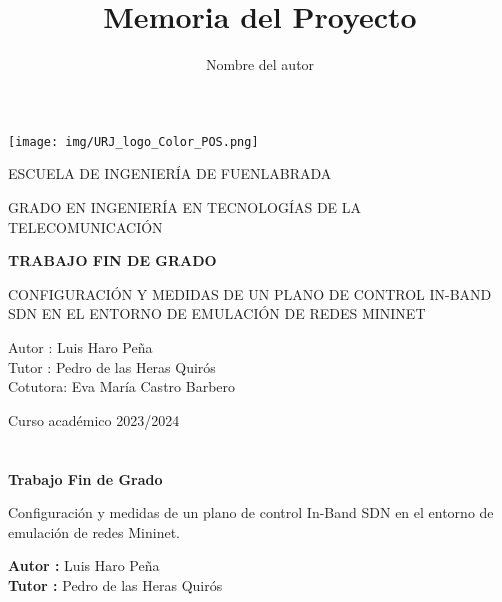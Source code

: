 \documentclass[a4paper, 12pt]{book}
\title{Memoria del Proyecto}
\author{Nombre del autor}
\begin{document}
	
	\renewcommand{\refname}{Bibliografía}  %
	\renewcommand{\appendixname}{Apéndice}
	
	
	
	\begin{titlepage}
		\begin{center}
			\texttt{[image: img/URJ\_logo\_Color\_POS.png]}
			
			\vspace{1.75cm}
			
			\LARGE
			ESCUELA DE INGENIERÍA DE FUENLABRADA
			\vspace{1cm}
			
			\LARGE
			GRADO EN INGENIERÍA EN TECNOLOGÍAS DE LA TELECOMUNICACIÓN
			
			\vspace{1cm}
			\LARGE
			\textbf{TRABAJO FIN DE GRADO}
			
			\vspace{1cm}
			
			\Large
			CONFIGURACIÓN Y MEDIDAS DE UN PLANO DE CONTROL IN-BAND SDN EN EL ENTORNO DE EMULACIÓN DE REDES MININET
			
			\vspace{2cm}
			
			\large
			Autor : Luis Haro Peña \\
			Tutor : Pedro de las Heras Quirós\\
			Cotutora: Eva María Castro Barbero
			\vspace{1cm}
			
			\large
			Curso académico 2023/2024
			
		\end{center}
	\end{titlepage}
	
	\newpage
	\mbox{}
	\thispagestyle{empty} %
	
	
	
	\clearpage
	\chapter*{}
	
	\vspace{-4cm}
	\begin{center}
		\LARGE
		\textbf{Trabajo Fin de Grado}
		
		\vspace{1cm}
		\large
		Configuración y medidas de un plano de control In-Band SDN en el entorno de emulación de redes Mininet.
		
		\vspace{1cm}
		\large
		\textbf{Autor :} Luis Haro Peña \\
		\textbf{Tutor :} Pedro de las Heras Quirós
		
	\end{center}
	
\end{document}
